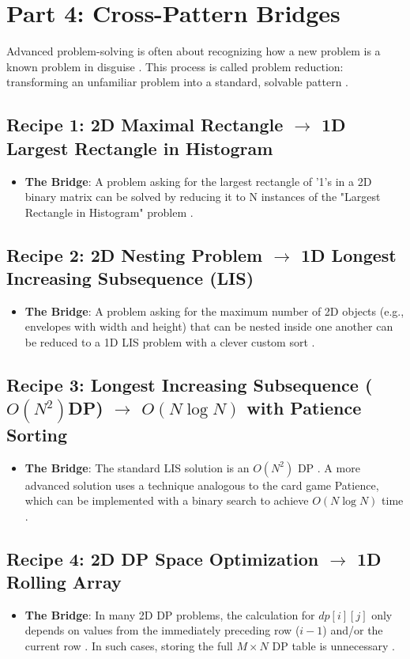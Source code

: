 \documentclass{article}
\begin{document}
\section{Part 4: Cross-Pattern Bridges}
Advanced problem-solving is often about recognizing how a new problem is a known problem in disguise \cite{1135}. This process is called problem reduction: transforming an unfamiliar problem into a standard, solvable pattern \cite{1136, 1137}.

\subsection{Recipe 1: 2D Maximal Rectangle $\rightarrow$ 1D Largest Rectangle in Histogram}
\begin{itemize}
\item \textbf{The Bridge}: A problem asking for the largest rectangle of '1's in a 2D binary matrix can be solved by reducing it to N instances of the "Largest Rectangle in Histogram" problem \cite{1139}.
\end{itemize}

\subsection{Recipe 2: 2D Nesting Problem $\rightarrow$ 1D Longest Increasing Subsequence (LIS)}
\begin{itemize}
\item \textbf{The Bridge}: A problem asking for the maximum number of 2D objects (e.g., envelopes with width and height) that can be nested inside one another can be reduced to a 1D LIS problem with a clever custom sort \cite{1152}.
\end{itemize}

\subsection{Recipe 3: Longest Increasing Subsequence ($O(N^2)$DP) $\rightarrow$ $O(N \log N)$ with Patience Sorting}
\begin{itemize}
\item \textbf{The Bridge}: The standard LIS solution is an $O(N^2)$ DP \cite{1163}. A more advanced solution uses a technique analogous to the card game Patience, which can be implemented with a binary search to achieve $O(N \log N)$ time \cite{1164, 1165}.
\end{itemize}

\subsection{Recipe 4: 2D DP Space Optimization $\rightarrow$ 1D Rolling Array}
\begin{itemize}
\item \textbf{The Bridge}: In many 2D DP problems, the calculation for $dp[i][j]$ only depends on values from the immediately preceding row ($i-1$) and/or the current row \cite{1182, 1183}. In such cases, storing the full $M \times N$ DP table is unnecessary \cite{1183}.
\end{itemize}
\end{document}
